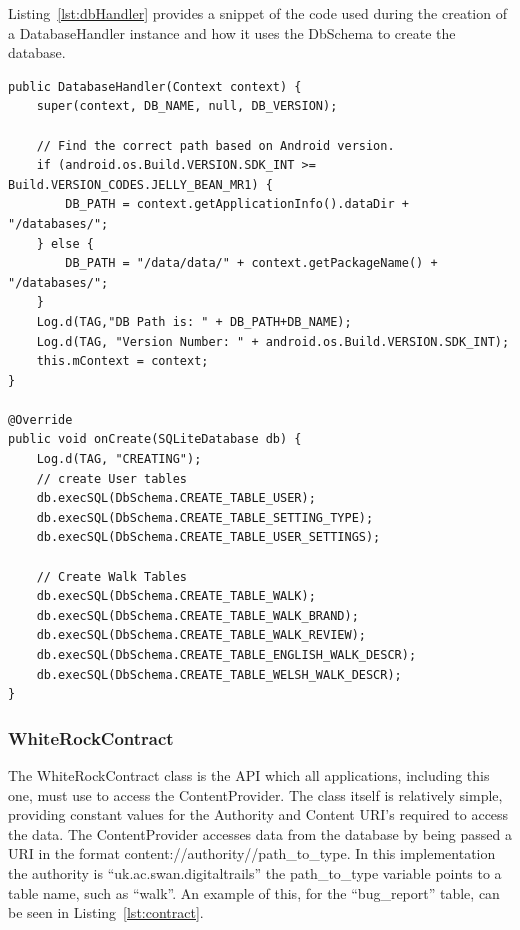 \documentclass[11pt,a4paper]{article}
\begin{document}
Listing~\ref{lst:dbHandler} provides a snippet of the code used during the creation of a DatabaseHandler instance and how it uses the DbSchema to create the database.

\begin{lstlisting}[captionpos=b, caption=DatabaseHandler Snippet, label=lst:dbHandler, frame=single]
public DatabaseHandler(Context context) {
	super(context, DB_NAME, null, DB_VERSION);

    // Find the correct path based on Android version.
    if (android.os.Build.VERSION.SDK_INT >= Build.VERSION_CODES.JELLY_BEAN_MR1) {
        DB_PATH = context.getApplicationInfo().dataDir + "/databases/";
    } else {
        DB_PATH = "/data/data/" + context.getPackageName() + "/databases/";
    }
    Log.d(TAG,"DB Path is: " + DB_PATH+DB_NAME);
    Log.d(TAG, "Version Number: " + android.os.Build.VERSION.SDK_INT);
    this.mContext = context;
}

@Override
public void onCreate(SQLiteDatabase db) {
    Log.d(TAG, "CREATING");
    // create User tables
    db.execSQL(DbSchema.CREATE_TABLE_USER);
    db.execSQL(DbSchema.CREATE_TABLE_SETTING_TYPE);
    db.execSQL(DbSchema.CREATE_TABLE_USER_SETTINGS);

    // Create Walk Tables
    db.execSQL(DbSchema.CREATE_TABLE_WALK);
    db.execSQL(DbSchema.CREATE_TABLE_WALK_BRAND);
    db.execSQL(DbSchema.CREATE_TABLE_WALK_REVIEW);
    db.execSQL(DbSchema.CREATE_TABLE_ENGLISH_WALK_DESCR);
    db.execSQL(DbSchema.CREATE_TABLE_WELSH_WALK_DESCR);
}
\end{lstlisting}

\subsubsection{WhiteRockContract}
The WhiteRockContract class is the API which all applications, including this one, must use to access the ContentProvider. The class itself is relatively simple, providing constant values for the Authority and Content URI's required to access the data. The ContentProvider accesses data from the database by being passed a URI in the format content://authority//path\_to\_type. In this implementation the authority is ``uk.ac.swan.digitaltrails'' the path\_to\_type variable points to a table name, such as ``walk''. An example of this, for the ``bug\_report'' table, can be seen in Listing~\ref{lst:contract}.
\end{document}
